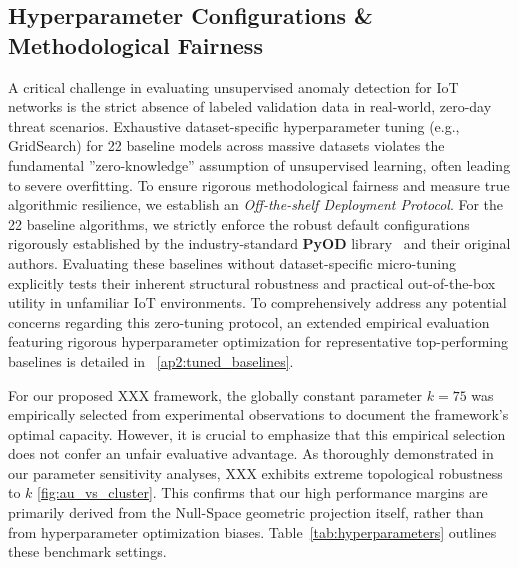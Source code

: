 \documentclass[final,twocolumn,10pt]{elsarticle}
\begin{document}
\subsection{Hyperparameter Configurations \& Methodological Fairness}
\label{ap1:hyperparameters}

A critical challenge in evaluating unsupervised anomaly detection for IoT networks is the strict absence of labeled validation data in real-world, zero-day threat scenarios. Exhaustive dataset-specific hyperparameter tuning (e.g., GridSearch) for 22 baseline models across massive datasets violates the fundamental ''zero-knowledge'' assumption of unsupervised learning, often leading to severe overfitting. To ensure rigorous methodological fairness and measure true algorithmic resilience, we establish an \textit{Off-the-shelf Deployment Protocol}. For the 22 baseline algorithms, we strictly enforce the robust default configurations rigorously established by the industry-standard \textbf{PyOD} library~\cite{zhao2019pyod} and their original authors. Evaluating these baselines without dataset-specific micro-tuning explicitly tests their inherent structural robustness and practical out-of-the-box utility in unfamiliar IoT environments. To comprehensively address any potential concerns regarding this zero-tuning protocol, an extended empirical evaluation featuring rigorous hyperparameter optimization for representative top-performing baselines is detailed in ~\ref{ap2:tuned_baselines}.


For our proposed XXX framework, the globally constant parameter $k=75$ was empirically selected from experimental observations to document the framework's optimal capacity. However, it is crucial to emphasize that this empirical selection does not confer an unfair evaluative advantage. As thoroughly demonstrated in our parameter sensitivity analyses, XXX exhibits extreme topological robustness to $k$ \ref{fig:au_vs_cluster}. This confirms that our high performance margins are primarily derived from the Null-Space geometric projection itself, rather than from hyperparameter optimization biases. Table~\ref{tab:hyperparameters} outlines these benchmark settings.
\end{document}

